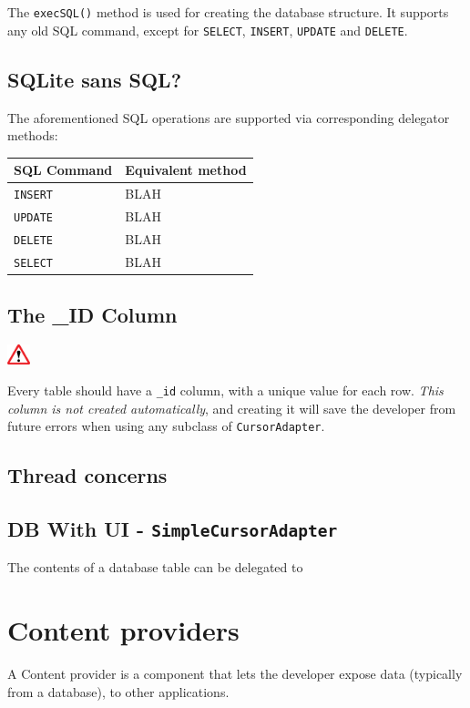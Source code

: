 \documentclass{article}
\def\cw#1{\texttt{#1}}
\begin{document}
The \cw{execSQL()} method is used for creating the database structure. It supports any old SQL command, except for \cw{SELECT}, \cw{INSERT}, \cw{UPDATE} and \cw{DELETE}.

\subsection{SQLite sans SQL?}
The aforementioned SQL operations are supported via corresponding delegator methods:

\begin{center}
    \begin{tabular}{ | l | l |}
    \hline
    SQL Command & Equivalent method \\ \hline
    \cw{INSERT} & BLAH \\ \hline
    \cw{UPDATE} & BLAH \\ \hline
    \cw{DELETE} & BLAH \\ \hline
    \cw{SELECT} & BLAH \\ \hline
    \end{tabular}
\end{center}

\subsection{The \_ID Column}

\begin{center}
\includegraphics[width=0.05\textwidth]{img/warning_sign.eps}
\end{center}

Every table should have a \cw{\_id} column, with a unique value for each row. \emph{This column is not created automatically}, and creating it will save the developer from future errors when using any subclass of \cw{CursorAdapter}. 

\subsection{Thread concerns}

\subsection{DB With UI - \cw{SimpleCursorAdapter}}
The contents of a database table can be delegated to 

\section{Content providers}
A Content provider is a component that lets the developer expose data (typically from a database), to other applications. 
\end{document}
